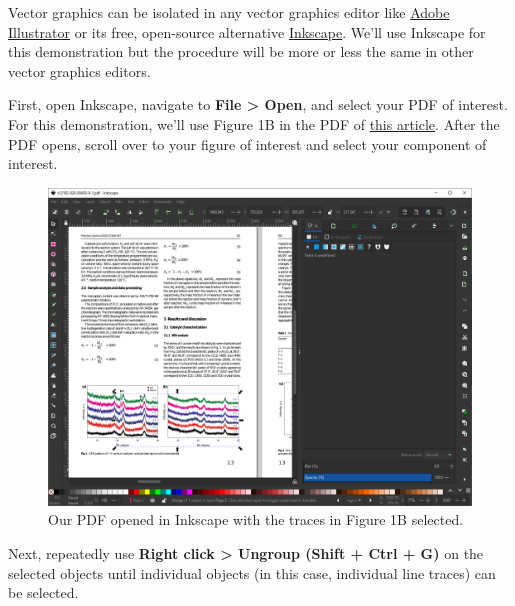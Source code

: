 \documentclass[letterpaper, 12pt]{article}
\begin{document}
Vector graphics can be isolated in any vector graphics editor like \href{https://www.adobe.com/products/illustrator.html}{Adobe Illustrator} or its free, open-source alternative \href{https://inkscape.org/}{Inkscape}. We'll use Inkscape for this demonstration but the procedure will be more or less the same in other vector graphics editors.

First, open Inkscape, navigate to \textbf{File > Open}, and select your PDF of interest. For this demonstration, we'll use Figure 1B in the PDF of \href{https://doi.org/10.1007/s12182-020-00439-9}{this article}. After the PDF opens, scroll over to your figure of interest and select your component of interest.

\begin{figure}[h!tbp]
    \includegraphics[width=\textwidth]{img/vector/in_inkscape.PNG}
    \caption*{Our PDF opened in Inkscape with the traces in Figure 1B selected.}
\end{figure}

\pagebreak
Next, repeatedly use \textbf{Right click > Ungroup (Shift + Ctrl + G)} on the selected objects until individual objects (in this case, individual line traces) can be selected.
\end{document}
